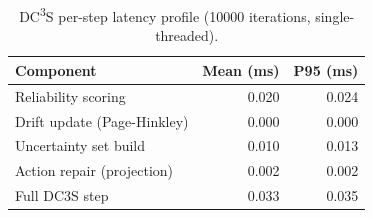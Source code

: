 \begin{table}[htbp]
\centering\small
\caption{DC\textsuperscript{3}S per-step latency profile (10000 iterations, single-threaded).}
\label{tab:dc3s_latency}
\begin{tabular}{lrr}
\toprule
Component & Mean (ms) & P95 (ms) \\
\midrule
  Reliability scoring & 0.020 & 0.024 \\
  Drift update (Page-Hinkley) & 0.000 & 0.000 \\
  Uncertainty set build & 0.010 & 0.013 \\
  Action repair (projection) & 0.002 & 0.002 \\
  Full DC3S step & 0.033 & 0.035 \\
\bottomrule
\end{tabular}
\end{table}
